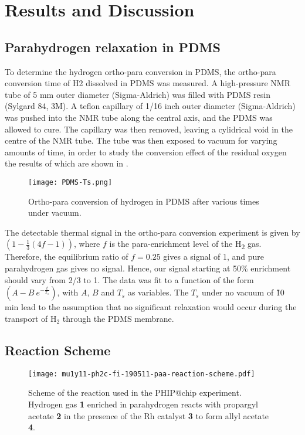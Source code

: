 \section{Results and Discussion}

\subsection{Parahydrogen relaxation in PDMS}

To determine the hydrogen ortho-para
conversion in PDMS, the ortho-para conversion time of H2 dissolved in PDMS
was measured. A high-pressure NMR tube of 5 mm outer diameter
(Sigma-Aldrich) was filled with PDMS resin (Sylgard 84, 3M). A teflon
capillary of 1/16 inch outer diameter (Sigma-Aldrich) was pushed
into the NMR tube along the central axis, and the PDMS was allowed to cure.
The capillary was then removed, leaving a cylidrical void in the centre of
the NMR tube. The tube was then exposed to vacuum for varying amounts of
time, in order to study the conversion effect of the residual oxygen the
results of which are shown in .

\begin{figure}[ht]
  \texttt{[image: PDMS-Ts.png]}
  \caption{Ortho-para conversion of hydrogen in PDMS after various times
  under vacuum.}
  \label{fig:ph2conv}
\end{figure}

The detectable thermal signal in the ortho-para conversion experiment is
given by
$(1 - \frac{1}{3}\left( 4f - 1 \right))$,
where $f$ is the
para-enrichment level of the H\textsubscript{2} gas.
Therefore, the equilibrium ratio of
$f = 0.25$ gives a signal of 1, and pure parahydrogen gas gives no
signal. Hence, our signal starting at 50\% enrichment should vary from
2/3 to 1.
The data was fit to a function of the form
$(A - B\ e^{- \frac{t}{T_{s}}})$, with $A$, $B$ and $T_{s}$ as
variables.
The $T_s$ under no vacuum of \~10 min lead to the assumption that no significant
relaxation would occur during the transport of H$_2$ through the PDMS membrane.

\subsection{Reaction Scheme}

\begin{figure*}[ht]
  \centering
  \texttt{[image: mu1y11-ph2c-fi-190511-paa-reaction-scheme.pdf]}
  \caption{
    Scheme of the reaction used in the PHIP@chip experiment. Hydrogen gas
    \textbf{1}
    enriched in parahydrogen reacts with propargyl acetate \textbf{2} in
    the presence of the Rh catalyst \textbf{3} to form allyl acetate \textbf{4}.
  }
  \label{fig:reaction-scheme}
\end{figure*}

